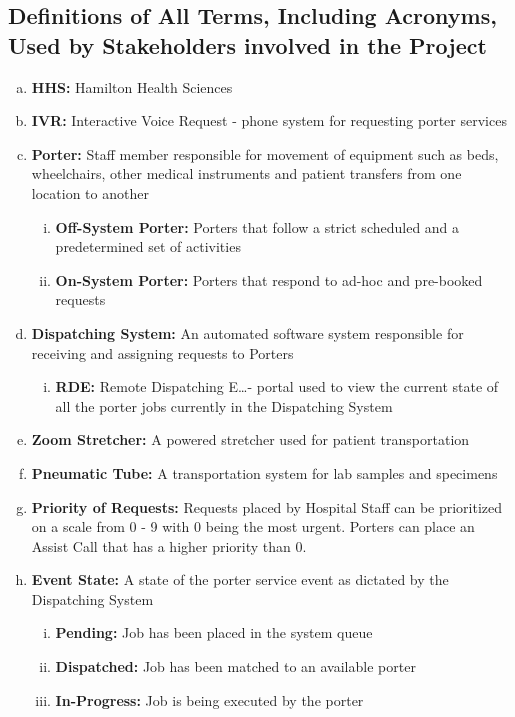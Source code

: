 \documentclass[paper=letter, fontsize=10pt]{scrartcl}
\numberwithin{equation}{section}		%
\numberwithin{figure}{section}			%
\numberwithin{table}{section}				%
\begin{document}
\subsection{Definitions of All Terms, Including Acronyms, Used by Stakeholders involved in the Project}
\begin{enumerate}[(a)]
	\item \textbf{HHS:} Hamilton Health Sciences
	\item \textbf{IVR:} Interactive Voice Request - phone system for requesting porter services
	\item \textbf{Porter:} Staff member responsible for movement of equipment such as beds, wheelchairs, other medical instruments and patient transfers from one location to another
	\begin{enumerate}[(i)]
		\item \textbf{Off-System Porter:} Porters that follow a strict scheduled and a predetermined set of activities
		\item \textbf{On-System Porter:} Porters that respond to ad-hoc and pre-booked requests	
	\end{enumerate}
	\item \textbf{Dispatching System:} An automated software system responsible for receiving and assigning requests to Porters
	\begin{enumerate}[(i)]
		\item \textbf{RDE:} Remote Dispatching E\ldots - portal used to view the current state of all the porter jobs currently in the Dispatching System
	\end{enumerate}
	\item \textbf{Zoom Stretcher:} A powered stretcher used for patient transportation
	\item \textbf{Pneumatic Tube:} A transportation system for lab samples and specimens
	\item \textbf{Priority of Requests:} Requests placed by Hospital Staff can be prioritized on a scale from 0 - 9 with 0 being the most urgent. Porters can place an Assist Call that has a higher priority than 0.
	\item \textbf{Event State:} A state of the porter service event as dictated by the Dispatching System
	\begin{enumerate}[(i)]
		\item \textbf{Pending:} Job has been placed in the system queue
		\item \textbf{Dispatched:} Job has been matched to an available porter
		\item \textbf{In-Progress:} Job is being executed by the porter

\end{enumerate}
\end{enumerate}
\end{document}
